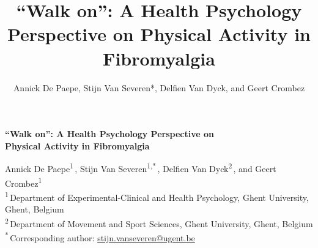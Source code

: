 \documentclass[11pt,a4paper]{article}
\title{``Walk on'': A Health Psychology Perspective on Physical Activity in Fibromyalgia}
\author{Annick De Paepe, Stijn Van Severen*, Delfien Van Dyck, and Geert Crombez}
\date{}
\begin{document}
\begin{titlepage}
\thispagestyle{fancy}
\vspace*{\fill}
\begin{center}
{\fontsize{18.8}{22.5}\selectfont\textbf{``Walk on'': A Health Psychology Perspective on\\
Physical Activity in Fibromyalgia}\par}
\vspace{1.2em}
\normalsize
Annick De Paepe\textsuperscript{1}\,,
Stijn Van Severen\textsuperscript{1,*}\,,
Delfien Van Dyck\textsuperscript{2}\,, and
Geert Crombez\textsuperscript{1}\,\\[0.6em]
\footnotesize
\textsuperscript{1}\,Department of Experimental-Clinical and Health Psychology,
Ghent University, Ghent, Belgium\\
\textsuperscript{2}\,Department of Movement and Sport Sciences,
Ghent University, Ghent, Belgium\\
\textsuperscript{*}\,Corresponding author: \href{mailto:stijn.vanseveren@ugent.be}{stijn.vanseveren@ugent.be}
\end{center}
\vspace{0.8em}


\end{titlepage}
\end{document}
